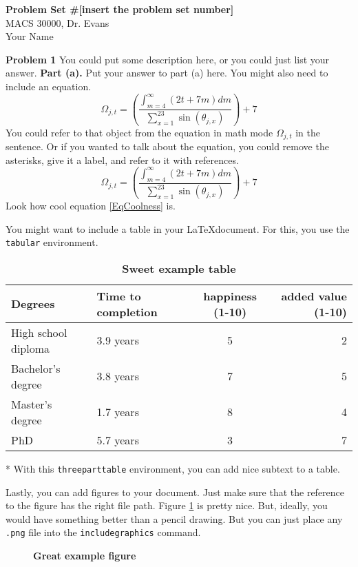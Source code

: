 \documentclass[letterpaper,12pt]{article}
\theoremstyle{definition}
\begin{document}
\begin{flushleft}
  \textbf{\large{Problem Set \#[insert the problem set number]}} \\
  MACS 30000, Dr. Evans \\
  Your Name
\end{flushleft}

\vspace{5mm}

\noindent\textbf{Problem 1}
You could put some description here, or you could just list your answer.
\textbf{Part (a).} Put your answer to part (a) here. You might also need to include an equation.
\begin{equation*}
  \Omega_{j,t} = \left(\frac{\int_{m=4}^\infty(2t + 7m)dm}{\sum_{x=1}^23\sin(\theta_{j,x})}\right) + 7
\end{equation*}
You could refer to that object from the equation in math mode $\Omega_{j,t}$ in the sentence. Or if you wanted to talk about the equation, you could remove the asterisks, give it a label, and refer to it with references.
\begin{equation}\label{EqCoolness}
  \Omega_{j,t} = \left(\frac{\int_{m=4}^\infty(2t + 7m)dm}{\sum_{x=1}^23\sin(\theta_{j,x})}\right) + 7
\end{equation}
Look how cool equation \eqref{EqCoolness} is.

You might want to include a table in your \LaTeX document. For this, you use the \texttt{tabular} environment.
\begin{table}[htbp] \centering \captionsetup{width=6.0in}
\caption{\label{TabExample}\textbf{Sweet example table}}
  \begin{threeparttable}
  \begin{tabular}{>{\small}l |>{\small}l >{\small}c |>{\small}r}
    \hline\hline
    Degrees & Time to completion & happiness (1-10) & added value (1-10) \\
    \hline
    High school diploma & 3.9 years & 5 & 2 \\
    Bachelor's degree   & 3.8 years & 7 & 5 \\
    Master's degree     & 1.7 years & 8 & 4 \\
    PhD                 & 5.7 years & 3 & 7 \\
    \hline\hline
  \end{tabular}
  \begin{tablenotes}
    \scriptsize{\item[*]With this \texttt{threeparttable} environment, you can add nice subtext to a table.}
  \end{tablenotes}
  \end{threeparttable}
\end{table}
Lastly, you can add figures to your document. Just make sure that the reference to the figure has the right file path. Figure \ref{FigExample} is pretty nice. But, ideally, you would have something better than a pencil drawing. But you can just place any \texttt{.png} file into the \texttt{includegraphics} command.
\begin{figure}[htb]\centering\captionsetup{width=4.0in}
  \caption{\textbf{Great example figure}}\label{FigExample}
\end{figure}
\end{document}
